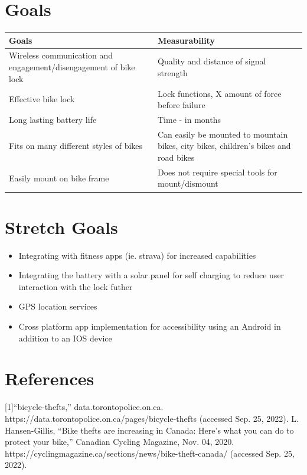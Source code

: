 \documentclass{article}
\begin{document}
\section{Goals}
\begin{table}[hp]
  \begin{center}
    \begin{tabular}{| p{0.5\linewidth} | p{0.5\linewidth} |}
    \hline
      \textbf{Goals} & \textbf{Measurability}\\
      \hline
      Wireless communication and engagement/disengagement of bike lock  & Quality and distance of signal strength\\
      \hline
      Effective bike lock  & Lock functions, X amount of force before failure\\
      \hline
      Long lasting battery life  & Time - in months \\
      \hline
      Fits on many different styles of bikes & Can easily be mounted to mountain bikes, city bikes, children's bikes and road bikes \\
      \hline
      Easily mount on bike frame & Does not require special tools for mount/dismount\\
      \hline
    \end{tabular}
  \end{center}
\end{table}

\section{Stretch Goals}
\begin{itemize}
\item Integrating with fitness apps (ie. strava) for increased capabilities
\item Integrating the battery with a solar panel for self charging to reduce user interaction with the lock futher
\item GPS location services
\item Cross platform app implementation for accessibility using an Android in addition to an IOS device
\end{itemize}

\section{References}

[1]“bicycle-thefts,” data.torontopolice.on.ca. https://data.torontopolice.on.ca/pages/bicycle-thefts (accessed Sep. 25, 2022).
\newline
[2]L. Hansen-Gillis, “Bike thefts are increasing in Canada: Here’s what you can do to protect your bike,” Canadian Cycling Magazine, Nov. 04, 2020. https://cyclingmagazine.ca/sections/news/bike-theft-canada/ (accessed Sep. 25, 2022).
‌
‌
\end{document}
